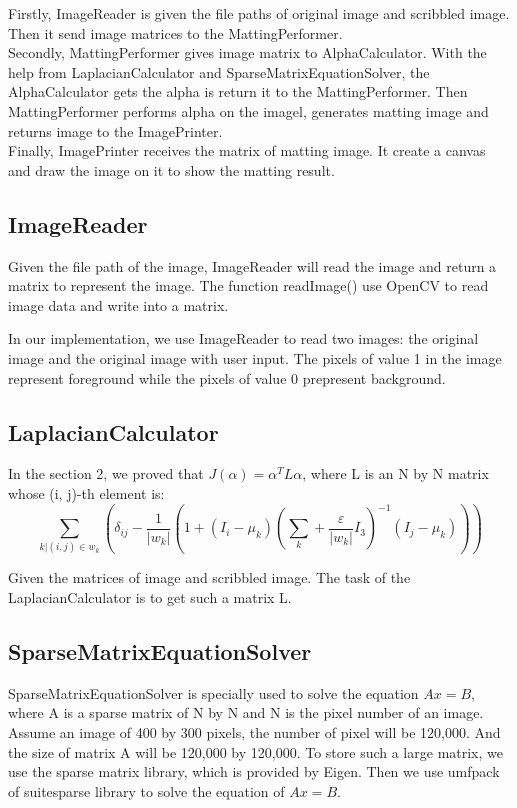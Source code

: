 \documentclass[11pt,letterpaper]{article}
\begin{document}
Firstly, ImageReader is given the file paths of original image and scribbled image. Then it send image matrices to the MattingPerformer. \\

Secondly, MattingPerformer gives image matrix to AlphaCalculator. With the help from LaplacianCalculator and SparseMatrixEquationSolver, the AlphaCalculator gets the alpha is return it to the MattingPerformer. Then MattingPerformer performs alpha on the imagel, generates matting image and returns image to the ImagePrinter.\\

Finally, ImagePrinter receives the matrix of matting image. It create a canvas and draw the image on it to show the matting result. 

\subsection{ImageReader}
Given the file path of the image, ImageReader will read the image and return a matrix to represent the image. The function readImage() use OpenCV to read image data and write into a matrix. 

In our implementation, we use ImageReader to read two images: the original image and the original image with user input. The pixels of value 1 in the image represent foreground while the pixels of value 0 prepresent background. 

\subsection{LaplacianCalculator}
In the section 2, we proved that $J(\alpha) = \alpha^T L \alpha$, where L is an N by N matrix whose (i, j)-th element is:
$$\sum_{k|(i,j) \in w_k} (\delta_{ij} - \frac{1}{|w_k|}(1 + (I_i - \mu_k)(\sum_k + \frac{\varepsilon}{|w_k|}I_3)^{-1}(I_j - \mu_k)))$$

Given the matrices of image and scribbled image. The task of the LaplacianCalculator is to get such a matrix L. 

\subsection{SparseMatrixEquationSolver}
SparseMatrixEquationSolver is specially used to solve the equation $Ax=B$, where A is a sparse matrix of N by N and N is the pixel number of an image. \\

Assume an image of 400 by 300 pixels, the number of pixel will be 120,000. And the size of matrix A will be 120,000 by 120,000. To store such a large matrix, we use the sparse matrix library, which is provided by Eigen. Then we use umfpack of suitesparse library to solve the equation of $Ax=B$. \\
\end{document}
